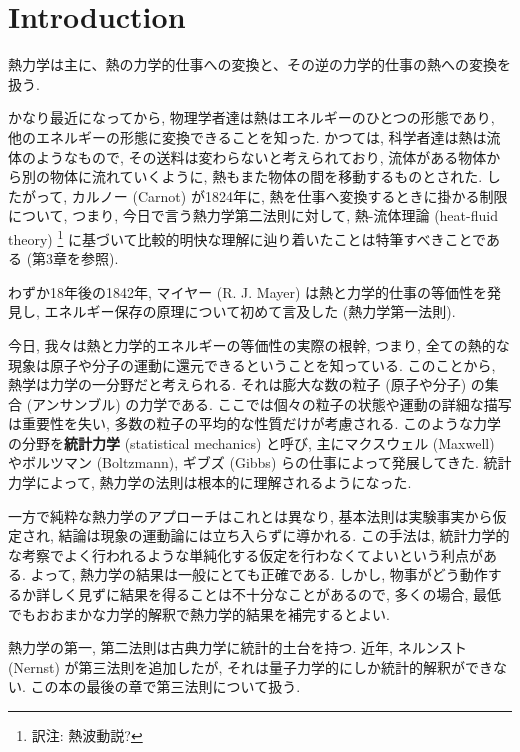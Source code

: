 \chapter{Introduction}
熱力学は主に、熱の力学的仕事への変換と、その逆の力学的仕事の熱への変換を扱う. \par
かなり最近になってから, 物理学者達は熱はエネルギーのひとつの形態であり, 他のエネルギーの形態に変換できることを知った. かつては, 科学者達は熱は流体のようなもので, その送料は変わらないと考えられており, 流体がある物体から別の物体に流れていくように, 熱もまた物体の間を移動するものとされた. したがって, カルノー (Carnot) が1824年に, 熱を仕事へ変換するときに掛かる制限について, つまり, 今日で言う熱力学第二法則に対して, 熱-流体理論 (heat-fluid theory) \footnote{訳注: 熱波動説?} に基づいて比較的明快な理解に辿り着いたことは特筆すべきことである (第3章を参照). \par
わずか18年後の1842年, マイヤー (R. J. Mayer) は熱と力学的仕事の等価性を発見し, エネルギー保存の原理について初めて言及した (熱力学第一法則). \par
今日, 我々は熱と力学的エネルギーの等価性の実際の根幹, つまり, 全ての熱的な現象は原子や分子の運動に還元できるということを知っている. このことから, 熱学は力学の一分野だと考えられる. それは膨大な数の粒子 (原子や分子) の集合 (アンサンブル) の力学である. ここでは個々の粒子の状態や運動の詳細な描写は重要性を失い, 多数の粒子の平均的な性質だけが考慮される. このような力学の分野を\textbf{統計力学} (statistical mechanics) と呼び, 主にマクスウェル (Maxwell) やボルツマン (Boltzmann), ギブズ (Gibbs) らの仕事によって発展してきた. 統計力学によって, 熱力学の法則は根本的に理解されるようになった. \par
一方で純粋な熱力学のアプローチはこれとは異なり, 基本法則は実験事実から仮定され, 結論は現象の運動論には立ち入らずに導かれる. この手法は, 統計力学的な考察でよく行われるような単純化する仮定を行わなくてよいという利点がある. よって, 熱力学の結果は一般にとても正確である. しかし, 物事がどう動作するか詳しく見ずに結果を得ることは不十分なことがあるので, 多くの場合, 最低でもおおまかな力学的解釈で熱力学的結果を補完するとよい. \par
熱力学の第一, 第二法則は古典力学に統計的土台を持つ. 近年, ネルンスト (Nernst) が第三法則を追加したが, それは量子力学的にしか統計的解釈ができない. この本の最後の章で第三法則について扱う. 

